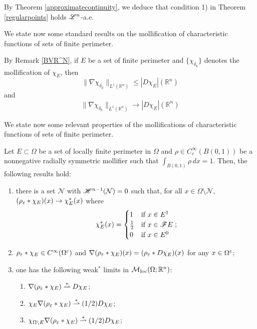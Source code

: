 \begin{remark} By Theorem \ref{approximatecontinuity}, we deduce that condition 1) in Theorem \ref{regularpoints} holds $\mathscr{L}^{n}$-a.e. 
\end{remark}

We state now some standard results on the mollification of characteristic functions of sets of finite perimeter.

\begin{remark} \label{chargradbound} By Remark \ref{BVR^N}, if $E$ be a set of finite perimeter and $\{ \chi_{\delta_{k}} \}$ denotes the mollification of $\chi_{E}$, then
\[ \|\nabla \chi_{\delta_{k}}\|_{L^{1}(\mathbb{R}^{n})} \le |D \chi_{E}|(\mathbb{R}^{n}) \]
and
\[ \|\nabla \chi_{\delta_{k}}\|_{L^{1}(\mathbb{R}^{n})} \to |D \chi_{E}|(\mathbb{R}^{n}) \]
\end{remark}

We state now some relevant properties of the mollifications of characteristic functions of sets of finite perimeter.

\begin{lemma} \label{mollcharconv} Let $E \subset \Omega$ be a set of locally finite perimeter in $\Omega$ and $\rho \in C^{\infty}_{c}(B(0, 1))$ be a nonnegative radially symmetric mollifier such that $\int_{B(0, 1)} \rho \, dx = 1$. Then, the following results hold:
\begin{enumerate}
	\item there is a set $\mathcal{N}$ with $\mathscr{H}^{n - 1}(\mathcal{N}) = 0$ such that, for all $x \in \Omega \setminus \mathcal{N}$, $(\rho_{\varepsilon} \ast \chi_{E})(x) \to \chi_{E}^{*}(x)$ where
\begin{equation}\label{PRChi}
 \chi_{E}^{*}(x) = \begin{cases} 1  &  \mbox{if} \ x \in E^{1} \\ \frac{1}{2} &  \mbox{if} \ x \in \mathscr{F} E \\ 0 &  \mbox{if} \ x \in E^{0} \end{cases} ;
\end{equation}
\item $\rho_{\varepsilon} \ast \chi_{E} \in C^{\infty}(\Omega^{\varepsilon})$ and $\nabla (\rho_{\varepsilon} \ast \chi_{E})(x) = (\rho_{\varepsilon} \ast D \chi_{E})(x)$ for any $x \in \Omega^{\varepsilon}$;
\item one has the following weak$^*$ limits in $\mathcal{M}_{\rm loc}(\Omega; \mathbb{R}^{n})$:
\begin{enumerate}
		\item $\nabla (\rho_{\varepsilon} \ast \chi_{E}) \overset{*}{\rightharpoonup} D\chi_{E}$;
		\item $\chi_{E} \nabla (\rho_{\varepsilon} \ast \chi_{E}) \overset{*}{\rightharpoonup} (1/2) D \chi_{E}$;
		\item $\chi_{\Omega \setminus E} \nabla (\rho_{\varepsilon} \ast \chi_{E}) \overset{*}{\rightharpoonup} (1/2) D \chi_{E}$;
\end{enumerate}
\end{enumerate}
\end{lemma}




